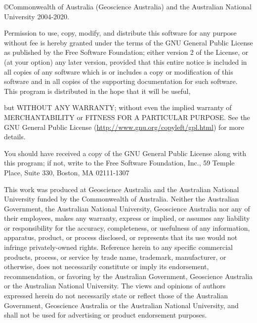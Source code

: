 %
%
%
%
%
%
%
%

\vspace*{0.5in}

\copyright Commonwealth of Australia (Geoscience Australia) and the Australian
National University 2004-2020.

Permission to use, copy, modify, and distribute this software for any
purpose without fee is hereby granted under the terms of the GNU
General Public License as published by the Free Software Foundation;
either version 2 of the License, or (at your option) any later
version, provided that this entire notice is included in all copies
of any software which is or includes a copy or modification of this
software and in all copies of the supporting documentation for such
software.
This program is distributed in the hope that it will be useful,

but WITHOUT ANY WARRANTY; without even the implied warranty of
MERCHANTABILITY or FITNESS FOR A PARTICULAR PURPOSE.  See the
GNU General Public License (\url{http://www.gnu.org/copyleft/gpl.html})
for more details.

You should have received a copy of the GNU General Public License
along with this program; if not, write to the Free Software
Foundation, Inc., 59 Temple Place, Suite 330, Boston, MA  02111-1307

This work was produced at Geoscience Australia and the Australian
National University funded by the Commonwealth of Australia. Neither
the Australian Government, the Australian National University,
Geoscience Australia nor any of their employees, makes any warranty,
express or implied, or assumes any liability or responsibility for
the accuracy, completeness, or usefulness of any information,
apparatus, product, or process disclosed, or represents that its use
would not infringe privately-owned rights. Reference herein to any
specific commercial products, process, or service by trade name,
trademark, manufacturer, or otherwise, does not necessarily
constitute or imply its endorsement, recommendation, or favoring by
the Australian Government, Geoscience Australia or the Australian
National University.  The views and opinions of authors expressed
herein do not necessarily state or reflect those of the Australian
Government, Geoscience Australia or the Australian National
University, and shall not be used for advertising or product
endorsement purposes.

